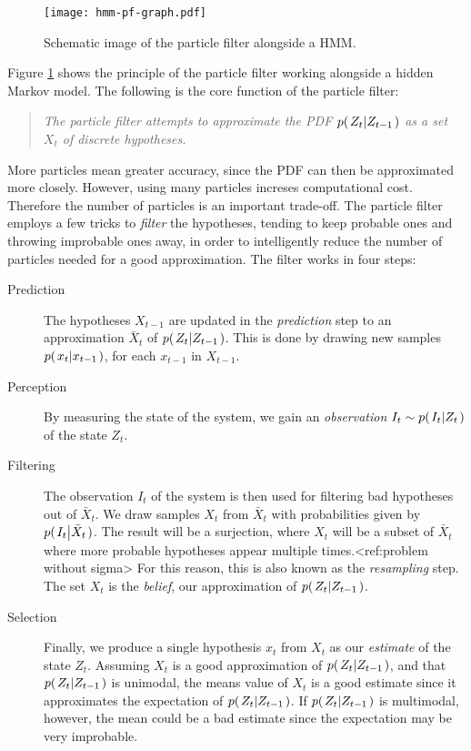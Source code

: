 \begin{figure}
  \centering
  \texttt{[image: hmm-pf-graph.pdf]}
  \caption{Schematic image of the particle filter alongside a HMM.}
  \label{fig:hmm-graph}
\end{figure}

Figure \ref{fig:hmm-graph} shows the principle of the particle filter
working alongside a hidden Markov model. The following is the core
function of the particle filter:

\begin{quote}
  \emph{The particle filter attempts to approximate the PDF
    $p{(\left. Z_t \middle\vert Z_{t-1} \right.)}$ as a set $X_t$ of discrete hypotheses.}
\end{quote}

More particles mean greater accuracy, since the PDF can then be
approximated more closely. However, using many particles increses
computational cost.  Therefore the number of particles is an important
trade-off.  The particle filter employs a few tricks to \emph{filter}
the hypotheses, tending to keep probable ones and throwing improbable
ones away, in order to intelligently reduce the number of particles
needed for a good approximation. The filter works in four steps:

\begin{description}
\item[Prediction] The hypotheses $X_{t-1}$ are updated in the
  \emph{prediction} step to an approximation $\bar{X}_t$ of
  $p{(\left. Z_t \middle\vert Z_{t-1} \right.)}$.  This is done by drawing new samples
  $p{(\left. x_t \middle\vert x_{t-1} \right.)}$, for each $x_{t-1}$ in $X_{t-1}$.
\item[Perception] By measuring the state of the system, we gain an
  \emph{observation} $I_t \sim p{(\left. I_t \middle\vert Z_t \right.)}$ of the state $Z_t$.
\item[Filtering] The observation $I_t$ of the system is then used for
  filtering bad hypotheses out of $\bar{X}_t$.  We draw samples $X_t$
  from $\bar{X}_t$ with probabilities given by
  $p{(\left. I_t \middle\vert \bar{X}_t \right.)}$. The result will be a surjection, where
  $X_t$ will be a subset of $\bar{X}_t$ where more probable hypotheses
  appear multiple times.<ref:problem without sigma> For this reason,
  this is also known as the \emph{resampling} step. The set $X_t$ is
  the \emph{belief}, our approximation of $p{(\left. Z_t \middle\vert Z_{t-1} \right.)}$.
\item[Selection] Finally, we produce a single hypothesis $x_t$ from
  $X_t$ as our \emph{estimate} of the state $Z_t$. Assuming $X_t$ is a
  good approximation of $p{(\left. Z_t \middle\vert Z_{t-1} \right.)}$, and that $p{(\left. Z_t \middle\vert Z_{t-1} \right.)}$ is
  unimodal, the means value of $X_t$ is a good estimate since it
  approximates the expectation of $p{(\left. Z_t \middle\vert Z_{t-1} \right.)}$.  If $p{(\left. Z_t \middle\vert Z_{t-1} \right.)}$
  is multimodal, however, the mean could be a bad estimate since the
  expectation may be very improbable.
\end{description}

